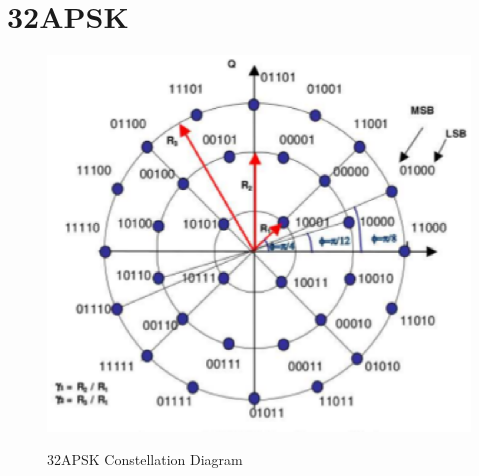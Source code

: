 \documentclass[journal,12pt,twocolumn]{IEEEtran}
\begin{document}
\section{32APSK}
\begin{figure}[h!]
\centering
\includegraphics[scale=0.4]{figs/32APSK.eps}
\label{32APSK Constellation Diagram}
\caption{32APSK Constellation Diagram}
\end{figure}
%
\end{document}
